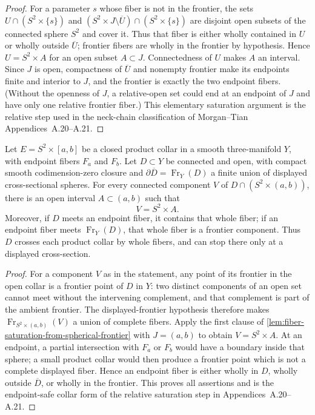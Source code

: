 \begin{proof}
For a parameter $s$ whose fiber is not in the frontier, the sets
$U\cap(S^2\times\{s\})$ and
$(S^2\times J\setminus\overline U)\cap(S^2\times\{s\})$ are disjoint open
subsets of the connected sphere $S^2$ and cover it.  Thus that fiber is
either wholly contained in $U$ or wholly outside $\overline U$; frontier
fibers are wholly in the frontier by hypothesis.  Hence
$U=S^2\times A$ for an open subset $A\subset J$.  Connectedness of $U$
makes $A$ an interval.  Since $J$ is open, compactness of $\overline U$ and
nonempty frontier make its endpoints finite and interior to $J$, and the
frontier is exactly the two endpoint fibers.  (Without the openness of $J$, a
relative-open set could end at an endpoint of $J$ and have only one relative
frontier fiber.)  This elementary saturation argument is the
relative step used in the neck-chain classification of Morgan--Tian
Appendices~A.20--A.21.
\end{proof}

\begin{lemma}
\label{lem:closed-collar-fiber-saturation}
\notready
Let $E=S^2\times[a,b]$ be a closed product collar in a smooth
three-manifold $Y$, with endpoint fibers $F_a$ and $F_b$.  Let $D\subset Y$ be
connected and open, with compact smooth codimension-zero closure and
\(\partial\overline D=\operatorname{Fr}_Y(D)\) a finite union of displayed
cross-sectional spheres.  For every connected component $V$ of
$D\cap(S^2\times(a,b))$, there is an open interval $A\subset(a,b)$ such that
\[
 V=S^2\times A.
\]
Moreover, if $D$ meets an endpoint fiber, it contains that whole fiber; if an
endpoint fiber meets $\operatorname{Fr}_Y(D)$, that whole fiber is a frontier
component.  Thus $D$ crosses each product collar by whole fibers, and can stop
there only at a displayed cross-section.
\end{lemma}

\begin{proof}
For a component $V$ as in the statement, any point of its frontier in the
open collar is a frontier point of $D$ in $Y$: two distinct components of an
open set cannot meet without the intervening complement, and that complement
is part of the ambient frontier.  The displayed-frontier hypothesis therefore
makes $\operatorname{Fr}_{S^2\times(a,b)}(V)$ a union of complete fibers.
Apply the first clause of
\ref{lem:fiber-saturation-from-spherical-frontier} with
$J=(a,b)$ to obtain $V=S^2\times A$.  At an endpoint, a partial intersection
with $F_a$ or $F_b$ would have a boundary inside that sphere; a small product
collar would then produce a frontier point which is not a complete displayed
fiber.  Hence an endpoint fiber is either wholly in $D$, wholly outside
$\overline D$, or wholly in the frontier.  This proves all assertions and is
the endpoint-safe collar form of the relative saturation step in
Appendices~A.20--A.21.
\end{proof}

